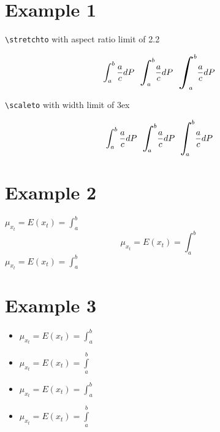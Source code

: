 \documentclass{article}
\def\stretchint#1{\vcenter{\hbox{\stretchto[220]{\displaystyle\int}{#1}}}}
\def\scaleint#1{\vcenter{\hbox{\scaleto[3ex]{\displaystyle\int}{#1}}}}
\def\bs{\!\!}
\begin{document}
\section{Example 1}


\def\x{\frac{a}{c}dP}  %

\verb|\stretchto| with aspect ratio limit of 2.2\par  %

\def\bs{\!\!\!\!}      %

\[
\int_a^b\x                          %
~~ {\stretchint{7ex}}_{\bs a}^b\x   %
~~ {\stretchint{9ex}}_{\bs a}^b\x   %
\]
\par{}


\verb|\scaleto| with width limit of 3ex\par  %
\def\bs{\!\!\!\!\!}

\[
\int_a^b\x ~~ {\scaleint{7ex}}_{\bs a}^b\x ~~ {\scaleint{9ex}}_{\bs a}^b\x
\]

\section{Example 2}
$ \mu_{x_{t}} = E(x_{t}) = \int_{a}^{b} $                  %
\[ \mu_{x_{t}} = E(x_{t}) = \int_{a}^{b} \]                %
$ \mu_{x_{t}} = E(x_{t}) = {\displaystyle \int_{a}^{b} } $ %

\section{Example 3}
\begin{itemize}
    \item $ \mu_{x_{t}} = E(x_{t}) = \int_{a}^{b} $
    \item $ \mu_{x_{t}} = E(x_{t}) = \int\limits_{a}^{b} $ %
    \item $ \mu_{x_{t}} = E(x_{t}) = \displaystyle\int_{a}^{b} $
    \item $ \mu_{x_{t}} = E(x_{t}) = \displaystyle\int\limits_{a}^{b} $ %
\end{itemize}
\end{document}
